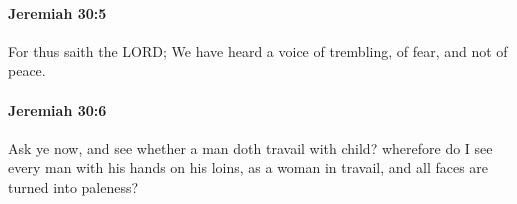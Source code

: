 		\paragraph{Jeremiah 30:5} %
			\label{JEREMIAH-30-5}

			For thus saith the LORD; We have heard a voice of trembling, of fear, and not of peace.


		\paragraph{Jeremiah 30:6} %
			\label{JEREMIAH-30-6}

			Ask ye now, and see whether a man doth travail with child? wherefore do I see every man with his hands on his loins, as a woman in travail, and all faces are turned into paleness?


